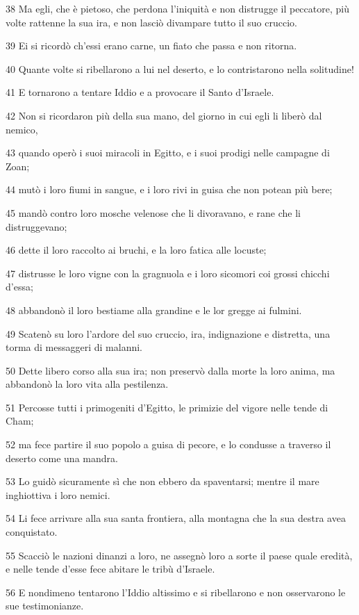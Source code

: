 \par 38 Ma egli, che è pietoso, che perdona l'iniquità e non distrugge il peccatore, più volte rattenne la sua ira, e non lasciò divampare tutto il suo cruccio.
\par 39 Ei si ricordò ch'essi erano carne, un fiato che passa e non ritorna.
\par 40 Quante volte si ribellarono a lui nel deserto, e lo contristarono nella solitudine!
\par 41 E tornarono a tentare Iddio e a provocare il Santo d'Israele.
\par 42 Non si ricordaron più della sua mano, del giorno in cui egli li liberò dal nemico,
\par 43 quando operò i suoi miracoli in Egitto, e i suoi prodigi nelle campagne di Zoan;
\par 44 mutò i loro fiumi in sangue, e i loro rivi in guisa che non potean più bere;
\par 45 mandò contro loro mosche velenose che li divoravano, e rane che li distruggevano;
\par 46 dette il loro raccolto ai bruchi, e la loro fatica alle locuste;
\par 47 distrusse le loro vigne con la gragnuola e i loro sicomori coi grossi chicchi d'essa;
\par 48 abbandonò il loro bestiame alla grandine e le lor gregge ai fulmini.
\par 49 Scatenò su loro l'ardore del suo cruccio, ira, indignazione e distretta, una torma di messaggeri di malanni.
\par 50 Dette libero corso alla sua ira; non preservò dalla morte la loro anima, ma abbandonò la loro vita alla pestilenza.
\par 51 Percosse tutti i primogeniti d'Egitto, le primizie del vigore nelle tende di Cham;
\par 52 ma fece partire il suo popolo a guisa di pecore, e lo condusse a traverso il deserto come una mandra.
\par 53 Lo guidò sicuramente sì che non ebbero da spaventarsi; mentre il mare inghiottiva i loro nemici.
\par 54 Li fece arrivare alla sua santa frontiera, alla montagna che la sua destra avea conquistato.
\par 55 Scacciò le nazioni dinanzi a loro, ne assegnò loro a sorte il paese quale eredità, e nelle tende d'esse fece abitare le tribù d'Israele.
\par 56 E nondimeno tentarono l'Iddio altissimo e si ribellarono e non osservarono le sue testimonianze.
